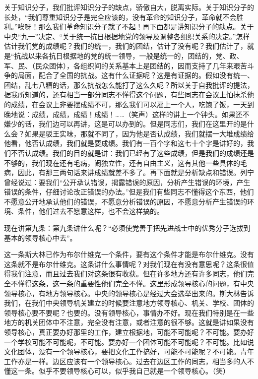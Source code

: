 关于知识分子，我们批评知识分子的缺点，骄傲自大，脱离实际。关于知识分子的长处，“我们尊重知识分子是完全应该的，没有革命的知识分子，革命就不会胜利。”唉呀！那么我们革命知识分子就了不起！再下面都是讲知识分子的缺点。关于中央“九一”决定、“关于统一抗日根据地党的领导及调整各组织关系的决定。”怎样估计我们党的成绩呢？我们的统一，我们的团结，估计了没有呢？我们估计了，就是“抗战以来各抗日根据地的党的统一领导，一般是统一的，团结的，党、政、军、民、（民众团体），各组织间的关系基本上是团结的，因而支持了几年来艰苦斗争的局面，配合了全国的抗战。这有什么证据呢？这是有证据的。假如没有统一、团结，乱七八糟的话，那么抗战怎么能打了这么久呢？所以关于自我批评的提法，据我所知道的，还有相当一部分同志不懂得这个问题，有些同志在会议上怕抹杀他的成绩，在会议上非要摆成绩不可，那么我们可以雇上一个人，吃饱了饭，一天到晚地说：成绩，成绩，成绩！成绩！……（笑声）这样的讲上一个钟头。如果还不嫌少的话，我们边可以再讲，这是可以办到的。但是同志们，我们在这里开的是什么会？如果是驳王实味，那就不同了，因为他是否认成绩，我们就摆一大堆成绩给他看，他否认成绩，我们就是要成绩。我们有一百个字和这七十个字是讲好的，我们不否认成绩。我们的目的就是讲：我们已经有了这些成绩，但是我们的成绩还是不够的，我们现在还有毛病，闹独立性，还有自由主义，这有其他一些具体的毛病，因此，有那三两句话来讲成绩就差不多了。再下面就是分析缺点和错误。列宁曾经说过：要我们“公开承认错误，揭露错误的原因，分析产生错误的环境，产生错误的条件，仔细讨论改正错误的办法。”但是我们有些同志不懂得这个东西，他们不愿意公开地承认他们的错误，不愿意分析错误的原因，不愿意分析产生错误的环境、条件，他们过去不愿意这样，也不会这样搞的。

现在讲第九条：第九条讲什么呢？“必须使党善于把先进战士中的优秀分子选拔到基本的领导核心中去”。

这一条斯大林已作为布尔什维克一个条件，要有这个条件才能是布尔什维克。没有这条就不是布尔什维克。这条讲什么事情呢？对我们现在有没有意思呢？这条很值得我们注意，而且过去我们对这条很有收获。但在许多地方还有许多同志，他们完全不懂得这条，这一条的重要性他们完全不懂。这里形成领导核心的问题，有中央领导核心，有地方领导核心。中央的领导核心是经过大会选举出来的。斯大林告诉我们，在我们中央领导机关建立的时候要注意地方领导核心、机关、学校、团体的领导核心要不要呢？也要的。没有领导核心，事情办不好。现在我们特别是在一些地方的机关团体中不注意，完全没有注意，或者注意的很不够。这就是讲如果没有领导核心，真正要办好那里的工作，建立根据地，可能不可能呢？不可能。要办好一个学校可能不可能呢，不可能。要办好一个团体可能不可能呢？不可能。比如说文化团体，没有一个领导核心，要把文化工作搞好，可能不可能呢？不可能。青年工作亦是一样。边区应该有一个领导核心。过去在边区工作的同志，相当多的人不懂这一条。似乎不要领导核心可以，似乎我自己就是一个领导核心。（笑）

